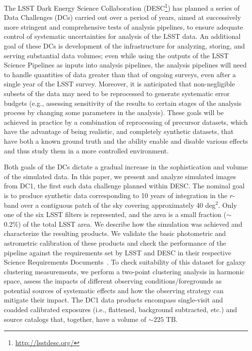 \documentclass[\docopts]{\docclass}
\begin{document}
The LSST Dark Energy Science Collaboration
(DESC\footnote{\url{http://lsstdesc.org/}}) has planned a series of
Data Challenges (DCs) carried out over a period of years, aimed at
successively more stringent and comprehensive tests of analysis
pipelines, to ensure adequate control of systematic uncertainties for
analysis of the LSST data.  An additional goal of these DCs is
development of the infrastructure for analyzing, storing, and serving
substantial data volumes; even while using the outputs of the LSST
Science Pipelines as inputs into analysis pipelines, the
analysis pipelines will need to handle quantities of data greater than that of 
ongoing surveys, even after a single year of the LSST survey. 
Moreover, it is anticipated that non-negligible subsets of
the data may need to be reprocessed to generate systematic error
budgets (e.g., assessing sensitivity of the results to certain stages
of the analysis process by changing some parameters in the
analysis). These goals will be achieved in practice by a combination
of reprocessing of precursor datasets, which have the advantage of
being realistic, and completely synthetic datasets, that have both a known ground 
truth and the ability enable and disable various effects and thus study them in a more controlled environment.

Both goals of the DCs dictate a gradual increase in the
sophistication and volume of the simulated data. In this paper, we
present and analyze simulated images from DC1, the first such
data challenge planned within DESC. The nominal goal 
is to produce synthetic data corresponding to 10 years of integration
in the $r$-band over a contiguous patch of the sky covering approximately 40 deg$^{2}$. 
Only one of the six LSST filters is represented, and the area is 
a small fraction ($\sim$ 0.2\%) of the total LSST area. We
describe how the simulation was achieved and characterize the resulting
products. We validate the basic photometric and astrometric
calibration of these products and check the performance of the
pipeline against the requirements set by LSST and DESC in their
respective Science Requirements Documents~\citep{LPM-17,
  2018arXiv180901669T}. To check suitability of this dataset for galaxy clustering
measurements, we perform a two-point clustering analysis in harmonic space, 
assess the impacts of different observing conditions/foregrounds as potential sources 
of systematic effects and how the observing strategy can mitigate their impact. The DC1 data products encompass single-visit and coadded calibrated exposures (i.e., flattened, background subtracted,
etc.) and source catalogs that, together, have a volume of $\sim 225$ TB.
\end{document}
